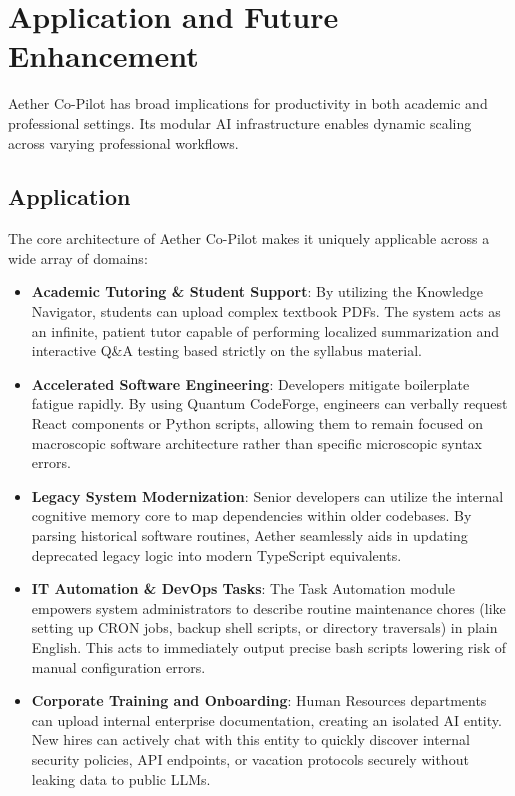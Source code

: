 \chapter{Application and Future Enhancement}

Aether Co-Pilot has broad implications for productivity in both academic and professional settings. Its modular AI infrastructure enables dynamic scaling across varying professional workflows.

\section{Application}
The core architecture of Aether Co-Pilot makes it uniquely applicable across a wide array of domains:
\begin{itemize}
    \item \textbf{Academic Tutoring \& Student Support}: By utilizing the Knowledge Navigator, students can upload complex textbook PDFs. The system acts as an infinite, patient tutor capable of performing localized summarization and interactive Q\&A testing based strictly on the syllabus material.
    \item \textbf{Accelerated Software Engineering}: Developers mitigate boilerplate fatigue rapidly. By using Quantum CodeForge, engineers can verbally request React components or Python scripts, allowing them to remain focused on macroscopic software architecture rather than specific microscopic syntax errors.
    \item \textbf{Legacy System Modernization}: Senior developers can utilize the internal cognitive memory core to map dependencies within older codebases. By parsing historical software routines, Aether seamlessly aids in updating deprecated legacy logic into modern TypeScript equivalents.
    \item \textbf{IT Automation \& DevOps Tasks}: The Task Automation module empowers system administrators to describe routine maintenance chores (like setting up CRON jobs, backup shell scripts, or directory traversals) in plain English. This acts to immediately output precise bash scripts lowering risk of manual configuration errors.
    \item \textbf{Corporate Training and Onboarding}: Human Resources departments can upload internal enterprise documentation, creating an isolated AI entity. New hires can actively chat with this entity to quickly discover internal security policies, API endpoints, or vacation protocols securely without leaking data to public LLMs.
\end{itemize}

